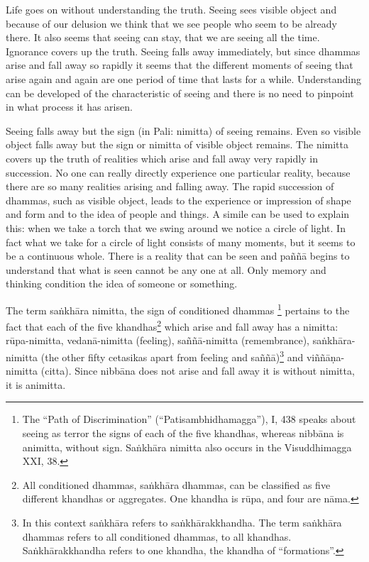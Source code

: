 Life goes on without understanding the truth. Seeing sees visible object
and because of our delusion we think that we see people who seem to be
already there. It also seems that seeing can stay, that we are seeing
all the time. Ignorance covers up the truth. Seeing falls away
immediately, but since dhammas arise and fall away so rapidly it seems
that the different moments of seeing that arise again and again are one
period of time that lasts for a while. Understanding can be developed of
the characteristic of seeing and there is no need to pinpoint in what
process it has arisen.

Seeing falls away but the sign (in Pali: nimitta) of seeing remains.
Even so visible object falls away but the sign or nimitta of visible
object remains. The nimitta covers up the truth of realities which arise
and fall away very rapidly in succession. No one can really directly
experience one particular reality, because there are so many realities
arising and falling away. The rapid succession of dhammas, such as
visible object, leads to the experience or impression of shape and form
and to the idea of people and things. A simile can be used to explain
this: when we take a torch that we swing around we notice a circle of
light. In fact what we take for a circle of light consists of many
moments, but it seems to be a continuous whole. There is a reality that
can be seen and paññā begins to understand that what is seen cannot be
any one at all. Only memory and thinking condition the idea of someone
or something.

The term saṅkhāra nimitta, the sign of conditioned dhammas
\footnote{The ``Path of
Discrimination'' (``Patisambhidhamagga''), I, 438 speaks about seeing as
terror the signs of each of the five khandhas, whereas nibbāna is
animitta, without sign. Saṅkhāra nimitta also occurs in the
Visuddhimagga XXI, 38.} pertains to the fact
that each of the five khandhas\footnote{All conditioned
dhammas, saṅkhāra dhammas, can be classified as five different khandhas
or aggregates. One khandha is rūpa, and four are nāma.} which arise and fall
away has a nimitta: rūpa-nimitta, vedanā-nimitta (feeling),
saññā-nimitta (remembrance), saṅkhāra-nimitta (the other fifty cetasikas
apart from feeling and saññā)\footnote{In this context
saṅkhāra refers to saṅkhārakkhandha. The term saṅkhāra dhammas refers to
all conditioned dhammas, to all khandhas. Saṅkhārakkhandha refers to one
khandha, the khandha of ``formations''.} and viññāṇa-nimitta
(citta). Since nibbāna does not arise and fall away it is without
nimitta, it is animitta.

